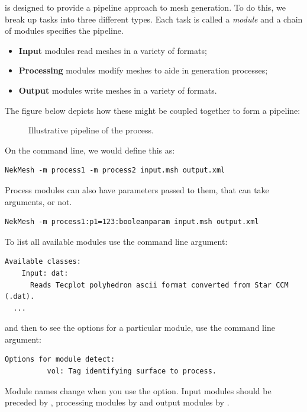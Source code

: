 \mc is designed to provide a pipeline approach to mesh generation. To do this,
we break up tasks into three different types. Each task is called a
\emph{module} and a chain of modules specifies the pipeline.
%
\begin{itemize}
  \item \textbf{Input} modules read meshes in a variety of formats;
  \item \textbf{Processing} modules modify meshes to aide in generation processes;
  \item \textbf{Output} modules write meshes in a variety of formats.
\end{itemize}
%
The figure below depicts how these might be coupled together to form a pipeline:
%
\begin{figure}
  \begin{center}
  \end{center}
  \caption{Illustrative pipeline of the \mc process.}
  \label{fig:util:mc:pipeline}
\end{figure}
%
On the command line, we would define this as:
%
\begin{lstlisting}[style=BashInputStyle]
  NekMesh -m process1 -m process2 input.msh output.xml
\end{lstlisting}
%
Process modules can also have parameters passed to them, that can take
arguments, or not.
%
\begin{lstlisting}[style=BashInputStyle]
  NekMesh -m process1:p1=123:booleanparam input.msh output.xml
\end{lstlisting}
%
To list all available modules use the  command line argument:
%
\begin{lstlisting}[style=BashInputStyle]
  Available classes:
    Input: dat:
      Reads Tecplot polyhedron ascii format converted from Star CCM (.dat).
  ...
\end{lstlisting}
%
and then to see the options for a particular module, use the  command
line argument:
%
\begin{lstlisting}[style=BashInputStyle]
  Options for module detect:
          vol: Tag identifying surface to process.
\end{lstlisting}
%
\begin{notebox}
  Module names change when you use the  option. Input modules should
  be preceded by , processing modules by  and output
  modules by .
\end{notebox}

